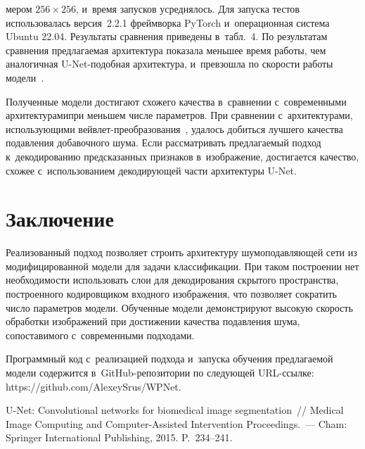 \begin{multicols}{2}
\vspace*{6pt}



\noindent
мером $256 \times 256$, и~время 
запусков усреднялось. Для запуска тестов использовалась версия~2.2.1 фреймворка 
PyTorch и~операционная система Ubuntu 22.04. Результаты сравнения приведены 
в~табл.~4. По результатам сравнения предлагаемая 
архитектура показала меньшее время работы, чем аналогичная U-Net-по\-доб\-ная 
архитектура, и~превзошла по ско\-рости работы модели~\cite{MWCNN, MDIWT, WINNet}.


Полученные модели достигают схожего качества в~сравнении с~современными 
архитектурами\linebreak при меньшем чис\-ле па\-ра\-мет\-ров. При сравнении с~архитектурами, 
использующими вейв\-лет-пре\-обра\-зо\-ва\-ния~\cite{MWCNN, MDIWT, WINNet}, удалось 
добиться лучшего качества
подавления до\-ба\-воч\-но\-го шума. Если рассматривать пред\-ла\-га\-емый подход 
к~декодированию пред\-ска\-зан\-ных признаков в~изоб\-ра\-же\-ние, достигается качество, 
схожее с~использованием де\-ко\-ди\-ру\-ющей час\-ти архитектуры U-Net.

\section{Заключение}

Реализованный подход позволяет строить архитектуру шумоподавляющей сети из 
модифицированной модели для задачи классификации. При таком построении нет 
необходимости использовать слои для декодирования скрытого пространства, 
построенного кодировщиком входного изображения, что позволяет сократить число 
параметров модели. Обученные модели демонстрируют высокую скорость обработки 
изображений при достижении качества подавления шума, сопоставимого с~современными подходами.

Программный код с~реализацией подхода и~запуска обучения предлагаемой модели 
содержится в~GitHub-ре\-по\-зи\-то\-рии по следующей URL-ссыл\-ке: 
{\sf https://github.com/AlexeySrus/WPNet}.

{\small\frenchspacing
 { %
 \begin{thebibliography}{99}
    U-Net: Convolutional networks for biomedical image segmentation~// Medical 
Image     Computing and Computer-Assisted Intervention Proceedings.~--- Cham: 
Springer International Publishing, 2015. P.~234--241.


\end{thebibliography}}}
\end{multicols}
